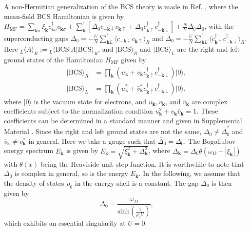 \documentclass[aps,prl,twocolumn,superscriptaddress]{revtex4-1}
\begin{document}
\begin{bibunit}[apsrev4-2]
A non-Hermitian generalization of the BCS theory is made in Ref. \cite{Yamamoto2019}, where the mean-field BCS Hamiltonian
is given by $H_{\mathrm{MF}}=\sum_{\boldsymbol{k}\sigma}\xi_{\boldsymbol{k}}c_{\boldsymbol{k}\sigma}^{\dagger}c_{\boldsymbol{k}\sigma}+\sum_{\bm{k}}^{'}[\bar{\Delta}_0c_{-\bm{k}\downarrow}c_{\bm{k}\uparrow}+\Delta_0 c_{\bm{k}\uparrow}^{\dagger}c_{-\bm{k}\downarrow}^{\dagger}]+\frac{N}{U}\bar{\Delta}_0\Delta_0$,
with the superconducting gaps $\Delta_0=-\frac{U}{N}\sum_{\boldsymbol{k}L}^{'}\langle c_{-\boldsymbol{k}\downarrow}c_{\boldsymbol{k}\uparrow}\rangle_{R}$
and $\bar{\Delta}_0=-\frac{U}{N}\sum_{\boldsymbol{k}L}^{'}\langle c_{\boldsymbol{k}\uparrow}^{\dagger}c_{-\boldsymbol{k}\downarrow}^{\dagger}\rangle_{R}$.
Here $_{L}\langle A\rangle_{R}:={}_{L}\langle\text{BCS}|A|\text{BCS}\rangle_{R}$,
and $|\text{BCS}\rangle_{R}$ and $|\text{BCS}\rangle_{L}$ are the
right and left ground states of the Hamiltonian $H_{\mathrm{MF}}$ given by \cite{Yamamoto2019} 
\begin{align}
|\text{BCS}\rangle_{R} & =\prod_{\bm{k}}(u_{\bm{k}}+v_{\bm{k}}c_{\boldsymbol{k}\uparrow}^{\dagger}c_{-\boldsymbol{k}\downarrow}^{\dagger})|0\rangle,\\
|\text{BCS}\rangle_{L} & =\prod_{\bm{k}}(u_{\bm{k}}^{*}+\bar{v}_{\bm{k}}^{*}c_{\boldsymbol{k}\uparrow}^{\dagger}c_{-\boldsymbol{k}\downarrow}^{\dagger})|0\rangle,
\end{align}
where $|0\rangle$ is the vacuum state for electrons, and $u_{\bm{k}},v_{\bm{k}}$,
and $\bar{v}_{\bm{k}}$ are complex coefficients subject to the normalization
condition $u_{\bm{k}}^{2}+v_{\bm{k}}\bar{v}_{\bm{k}}=1$. These coefficients
can be determined in a standard manner and given in Supplemental Material
\cite{SupplementaryMaterial}. Since the right and left ground states
are not the same, $\Delta_0\neq\bar{\Delta}_0^{*}$ and $\bar{v}_{\bm{k}}\neq v_{\bm{k}}^{*}$
in general. Here we take a gauge such that $\bar{\Delta}_0=\Delta_0$. The Bogoliubov energy spectrum $E_{\bm{k}}$ is given by
\cite{Yamamoto2019} 
$E_{\bm{k}}=\sqrt{\xi_{\bm{k}}^{2}+\Delta_{\bm{k}}^{2}}$,
where $\Delta_{\bm{k}}=\Delta_0\theta(\omega_{D}-|\xi_{\bm{k}}|)$
with $\theta(x)$ being the Heaviside unit-step function. It is worthwhile
to note that $\Delta_0$ is complex in general, so is the energy
$E_{\bm{k}}$. In the following, we assume that the density of states
$\rho_{0}$ in the energy shell is a constant. The gap $\Delta_0$
is then given by 
\begin{equation}
\Delta_0=\frac{\omega_{D}}{\text{sinh}\left(\frac{1}{\rho_{0}U}\right)},\label{eq:gap}
\end{equation}
which exhibits an essential singularity at $U=0$.


\end{bibunit}
\end{document}
